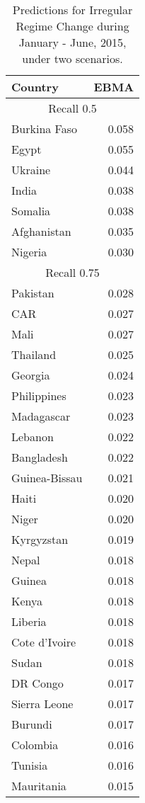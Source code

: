 \documentclass[pdftex,11pt]{article}
\begin{document}
\begin{table}[!ht]
\centering
\caption{Predictions for Irregular Regime Change during January - June, 2015, under two scenarios.}
\label{high-fcas}
\begin{tabular}{lr}
  \toprule
 Country & EBMA \\ 
  \midrule
  \multicolumn{2}{c}{Recall 0.5} \\ \midrule
Burkina Faso & 0.058 \\
Egypt & 0.055 \\
Ukraine & 0.044 \\
India & 0.038 \\
Somalia & 0.038 \\
Afghanistan & 0.035 \\
Nigeria & 0.030 \\ \midrule
  \multicolumn{2}{c}{Recall 0.75} \\ \midrule
Pakistan & 0.028 \\ 
CAR & 0.027 \\ 
Mali & 0.027 \\ 
Thailand & 0.025 \\ 
Georgia & 0.024 \\ 
Philippines & 0.023 \\ 
Madagascar & 0.023 \\ 
Lebanon & 0.022 \\ 
Bangladesh & 0.022 \\ 
Guinea-Bissau & 0.021 \\ 
Haiti & 0.020 \\ 
Niger & 0.020 \\ 
Kyrgyzstan & 0.019 \\ 
Nepal & 0.018 \\ 
Guinea & 0.018 \\ 
Kenya & 0.018 \\ 
Liberia & 0.018 \\ 
Cote d'Ivoire & 0.018 \\ 
Sudan & 0.018 \\ 
DR Congo & 0.017 \\ 
Sierra Leone & 0.017 \\ 
Burundi & 0.017 \\ 
Colombia & 0.016 \\ 
Tunisia & 0.016 \\ 
Mauritania & 0.015 \\ \bottomrule
\end{tabular}
\end{table}
\end{document}
